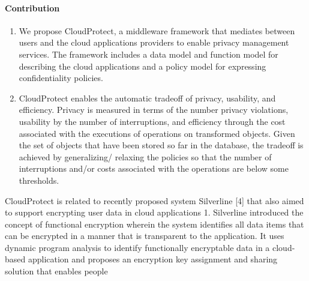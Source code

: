 \documentclass[11pt,onecolumn]{article}
\begin{document}
\paragraph{Contribution}

\begin{enumerate}
\item
 We propose CloudProtect, a middleware framework that mediates between users
and the cloud applications providers to enable privacy management services.
The framework includes a data model and function model for describing the
cloud applications and a policy model for expressing confidentiality policies.

\item
 CloudProtect enables the automatic tradeoff of privacy, usability, and efficiency.
Privacy is measured in terms of the number privacy violations, usability by
the number of interruptions, and efficiency through the cost associated with
the executions of operations on transformed objects. Given the set of objects
that have been stored so far in the database, the tradeoff is achieved by generalizing/
relaxing the policies so that the number of interruptions and/or costs
associated with the operations are below some thresholds.

\end{enumerate}



CloudProtect is related to recently proposed system Silverline [4] that also aimed
to support encrypting user data in cloud applications 1. Silverline introduced the
concept of functional encryption wherein the system identifies all data items that can
be encrypted in a manner that is transparent to the application. It uses dynamic program
analysis to identify functionally encryptable data in a cloud-based application
and proposes an encryption key assignment and sharing solution that enables people
\end{document}
